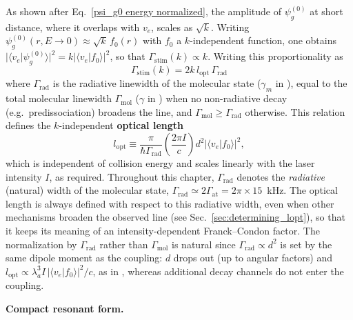 As shown after Eq.~\ref{psi_g0 energy normalized}, the amplitude of
$\psi_g^{(0)}$ at short distance, where it overlaps with $v_e$, scales as
$\sqrt{k}$. Writing $\psi_g^{(0)}(r,E\to0)\approx\sqrt{k}\,f_0(r)$ with $f_0$ a
$k$-independent function, one obtains
$\vert\langle v_e\vert\psi_g^{(0)}\rangle\vert^2=k\vert\langle v_e\vert
f_0\rangle\vert^2$, so that $\Gamma_{\text{stim}}(k)\propto k$. Writing this
proportionality as \cite{yan_controlling_2013}
\begin{equation}
    \Gamma_{\text{stim}}(k) = 2 k\,l_{\text{opt}}\,\Gamma_{\text{rad}}
    \label{eq:gamma_stim_blatt}
\end{equation}
where $\Gamma_{\text{rad}}$ is the radiative linewidth of the molecular state
($\gamma_m$ in \cite{blatt_systematic_2011}), equal to the total molecular linewidth
$\Gamma_{\text{mol}}$ ($\gamma$ in \cite{blatt_systematic_2011}) when no non-radiative
decay (e.g.\ predissociation) broadens the line, and $\Gamma_{\text{mol}}\geq\Gamma_{\text{rad}}$ otherwise.
This relation defines the $k$-independent \textbf{optical length}
\begin{equation}
    l_{\text{opt}} \equiv \frac{\pi}{\hbar\Gamma_{\text{rad}}}\left(\frac{2\pi I}{c}\right)d^2\left\vert\langle v_e\vert f_0\rangle\right\vert^2,
    \label{lopt_def}
\end{equation}
which is independent of collision energy and scales linearly with the laser
intensity $I$, as required. Throughout this chapter, $\Gamma_{\text{rad}}$ denotes
the \textit{radiative} (natural) width of the molecular state,
$\Gamma_{\text{rad}} \simeq 2\Gamma_{\text{at}} = 2\pi\times15$~kHz. The optical
length is always defined with respect to this radiative width, even when other
mechanisms broaden the observed line (see Sec.~\ref{sec:determining_lopt}), so
that it keeps its meaning of an intensity-dependent Franck--Condon factor. The
normalization by $\Gamma_{\text{rad}}$ rather than $\Gamma_{\text{mol}}$ is natural
since $\Gamma_{\text{rad}}\propto d^2$ is set by the same dipole moment as the coupling:
$d$ drops out (up to angular factors) and $l_{\text{opt}}\propto\lambda_a^3 I\,\vert\langle v_e\vert f_0\rangle\vert^2/c$,
as in \cite{blatt_systematic_2011}, whereas additional decay channels do not enter the coupling.

\textbf{Compact resonant form.}

